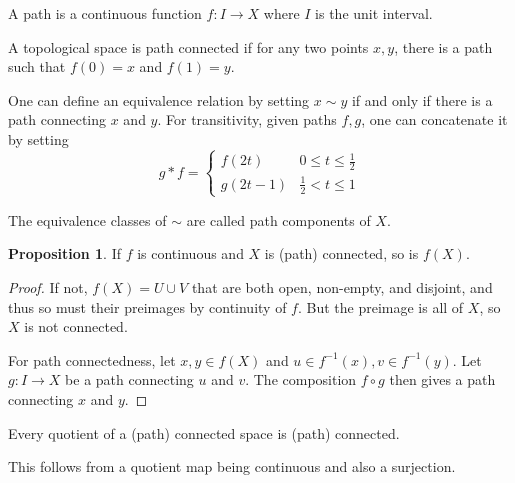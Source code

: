 \documentclass[12pt,reqno]{amsart}
\numberwithin{theorem}{section}
\theoremstyle{definition}
\theoremstyle{remark}
\numberwithin{equation}{section}
\theoremstyle{definition}
\newtheorem{prop}[theorem]{Proposition}
\begin{document}
\begin{definition}
    A path is a continuous function $f:I\rightarrow X$ where $I$ is the unit interval.
\end{definition}
\begin{definition}
    A topological space is path connected if for any two points $x,y$, there is a path such that $f(0)=x $ and $f(1)=y$.
\end{definition}
One can define an equivalence relation by setting $x\sim y$ if and only if there is a path connecting $x$ and $y$. For transitivity, given paths $f,g$, one can concatenate it by setting 
$$g*f = \begin{cases}
    f(2t) & 0\leq t \leq \frac 1 2 \\
    g(2t-1) & \frac 1 2 < t \leq 1
\end{cases}$$
\begin{definition}
    The equivalence classes of $\sim$ are called path components of $X$.
\end{definition}
\begin{prop}
    If $f$ is continuous and $X$ is (path) connected, so is $f(X)$.
\end{prop}
\begin{proof}
    If not, $f(X) = U\cup V$ that are both open, non-empty, and disjoint, and thus so must their preimages by continuity of $f$. But the preimage is all of $X$, so $X$ is not connected.

    For path connectedness, let $x,y \in f(X)$ and $u \in f^{-1}(x),v \in f^{-1}(y)$. Let $g:I\rightarrow X$ be a path connecting $u$ and $v$. The composition $f\circ g$ then gives a path connecting $x$ and $y$.
\end{proof}
\begin{corollary}
    Every quotient of a (path) connected space is (path) connected.
\end{corollary}
This follows from a quotient map being continuous and also a surjection.
\end{document}
